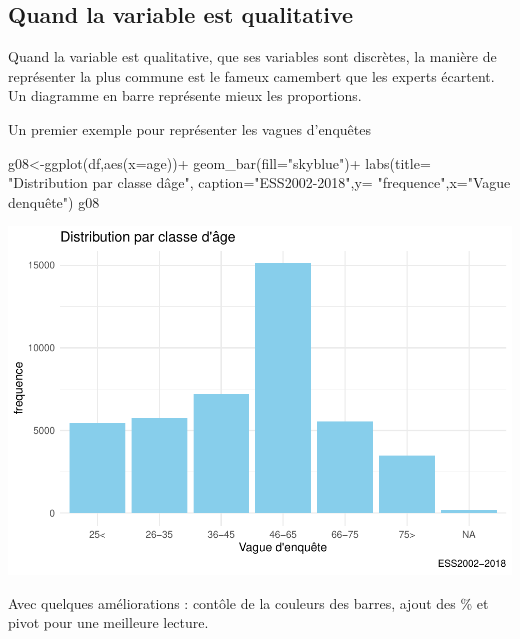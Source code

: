 \documentclass[
]{book}
\newenvironment{Shaded}{\begin{snugshade}}{\end{snugshade}}
\newcommand{\AttributeTok}[1]{\textcolor[rgb]{0.77,0.63,0.00}{#1}}
\newcommand{\FunctionTok}[1]{\textcolor[rgb]{0.00,0.00,0.00}{#1}}
\newcommand{\NormalTok}[1]{#1}
\newcommand{\OtherTok}[1]{\textcolor[rgb]{0.56,0.35,0.01}{#1}}
\newcommand{\SpecialCharTok}[1]{\textcolor[rgb]{0.00,0.00,0.00}{#1}}
\newcommand{\StringTok}[1]{\textcolor[rgb]{0.31,0.60,0.02}{#1}}
\begin{document}
\hypertarget{quand-la-variable-est-qualitative}{%
\subsection{Quand la variable est qualitative}\label{quand-la-variable-est-qualitative}}

Quand la variable est qualitative, que ses variables sont discrètes, la manière de représenter la plus commune est le fameux camembert que les experts écartent. Un diagramme en barre représente mieux les proportions.

Un premier exemple pour représenter les vagues d'enquêtes

\begin{Shaded}
\begin{Highlighting}[]
\NormalTok{g08}\OtherTok{\textless{}{-}}\FunctionTok{ggplot}\NormalTok{(df,}\FunctionTok{aes}\NormalTok{(}\AttributeTok{x=}\NormalTok{age))}\SpecialCharTok{+}
  \FunctionTok{geom\_bar}\NormalTok{(}\AttributeTok{fill=}\StringTok{"skyblue"}\NormalTok{)}\SpecialCharTok{+}
  \FunctionTok{labs}\NormalTok{(}\AttributeTok{title=} \StringTok{"Distribution par classe d\textquotesingle{}âge"}\NormalTok{, }\AttributeTok{caption=}\StringTok{"ESS2002{-}2018"}\NormalTok{,}\AttributeTok{y=} \StringTok{"frequence"}\NormalTok{,}\AttributeTok{x=}\StringTok{"Vague d\textquotesingle{}enquête"}\NormalTok{) }
\NormalTok{g08}
\end{Highlighting}
\end{Shaded}

\includegraphics{bookdown-demo_files/figure-latex/308-1.pdf}

Avec quelques améliorations : contôle de la couleurs des barres, ajout des \% et pivot pour une meilleure lecture.
\end{document}
